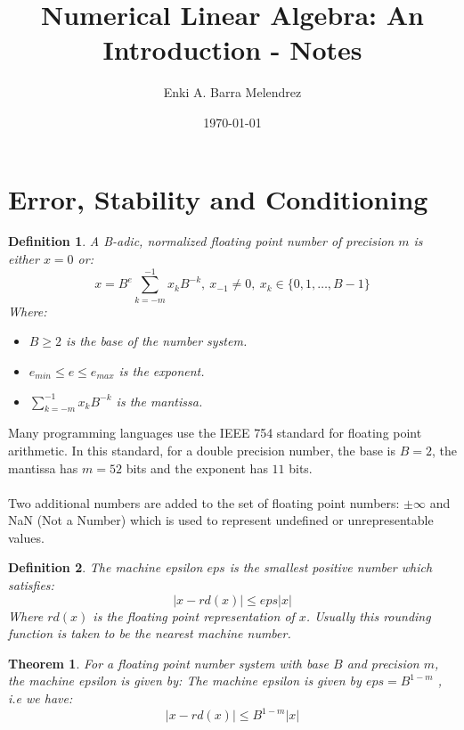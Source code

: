 \documentclass[a4paper, 12pt]{article}
\title{\Large{Numerical Linear Algebra: An Introduction - Notes}}
\author{
  Enki A. Barra Melendrez
}
\date{\today}
\newtheorem{theorem}{Theorem}[section]
\newtheorem{definition}{Definition}[section]
\newcommand {\1}{\textrm{\textbf{1}}}
\begin{document}
\maketitle
\setcounter{section}{1}

\section{Error, Stability and Conditioning}

\begin{definition}
    A B-adic, normalized floating point number of precision $m$ is either $x=0$ or:\\
    \begin{equation*}
        x = B^e \sum_{k=-m}^{-1} x_k B^{-k}, \ x_{-1} \neq 0, \ x_k \in \{0,1,\ldots,B-1\}
    \end{equation*}
    Where: 
    \begin{itemize}
        \item $B \geq 2$ is the base of the number system.
        \item $e_{min} \leq e \leq e_{max}$ is the exponent.
        \item $\sum_{k=-m}^{-1} x_k B^{-k}$ is the mantissa.
    \end{itemize}
\end{definition}

Many programming languages use the IEEE 754 standard for floating point arithmetic. In this standard, for a double precision number, the base is $B=2$, the mantissa has $m=52$ 
bits and the exponent has $11$ bits.
\\
\\
Two additional numbers are added to the set of floating point numbers: $\pm \infty$ and NaN (Not a Number) which is used to represent undefined or unrepresentable values.
\begin{definition}
    The machine epsilon $eps$ is the smallest positive number which satisfies:
    \[
       | x -rd(x) | \leq eps | x |
    \]
    Where $rd(x)$ is the floating point representation of $x$. Usually this rounding function is taken to be 
    the nearest machine number.
\end{definition}

\setcounter{theorem}{2}
\begin{theorem}
    For a floating point number system with base $B$ and precision $m$, the machine epsilon is given by:
    The machine epsilon is given by $eps = B^{1-m}$ , i.e we have: 
    \[
        | x -rd(x) | \leq B^{1-m} | x |
    \]
\end{theorem}
\end{document}
